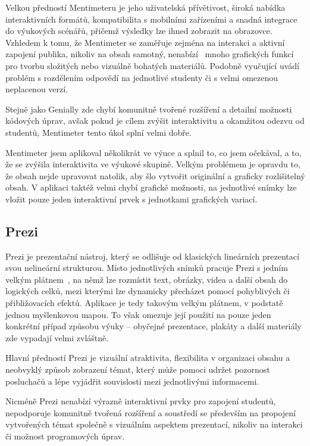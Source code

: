 Velkou předností Mentimeteru je jeho uživatelská přívětivost, široká nabídka interaktivních formátů, kompatibilita s mobilními zařízeními a snadná integrace do výukových scénářů, přičemž výsledky lze ihned zobrazit na obrazovce. 
Vzhledem k tomu, že Mentimeter se zaměřuje zejména na interakci a aktivní zapojení publika, nikoliv na obsah samotný, nenabízí~\cite{mentimeter_review} mnoho grafických funkcí pro tvorbu složitých nebo vizuálně bohatých materiálů. 
Podobně vyučující uvádí problém s rozdělením odpovědí na jednotlivé studenty či s velmi omezenou neplacenou verzí.

Stejně jako Genially zde chybí komunitně tvořené rozšíření a detailní možnosti kódových úprav, avšak pokud je cílem zvýšit interaktivitu a okamžitou odezvu od studentů, Mentimeter tento úkol splní velmi dobře.

Mentimeter jsem aplikoval několikrát ve výuce a splnil to, co jsem očekával, a to, že se zvýšila interaktivita ve výukové skupině. 
Velkým problémem je opravdu to, že obsah nejde upravovat natolik, aby šlo vytvořit originální a graficky rozlišitelný obsah. 
V aplikaci taktéž velmi chybí grafické možnosti, na jednotlivé snímky lze vložit pouze jeden interaktivní prvek s jednotkami grafických variací.

\subsection{Prezi}

Prezi je prezentační nástroj, který se odlišuje od klasických lineárních prezentací svou nelineární strukturou.
Místo jednotlivých snímků pracuje Prezi s jedním velkým plátnem~\cite{prezi}, na němž lze rozmístit text, obrázky, videa a další obsah do logických celků, mezi kterými lze dynamicky přecházet pomocí pohyblivých či přibližovacích efektů.
Aplikace je tedy takovým velkým plátnem, v podstatě jednou myšlenkovou mapou.
To však omezuje její použití na pouze jeden konkrétní případ způsobu výuky -- obyčejné prezentace, plakáty a další materiály zde vypadají velmi zvláštně.

Hlavní předností Prezi je vizuální atraktivita, flexibilita v organizaci obsahu a neobvyklý způsob zobrazení témat, který může pomoci udržet pozornost posluchačů a lépe vyjádřit souvislosti mezi jednotlivými informacemi. 

Nicméně Prezi nenabízí výrazně interaktivní prvky pro zapojení studentů, nepodporuje komunitně tvořená rozšíření a soustředí se především na propojení vytvořených témat společně s vizuálním aspektem prezentací, nikoliv na interakci či možnost programových úprav.

